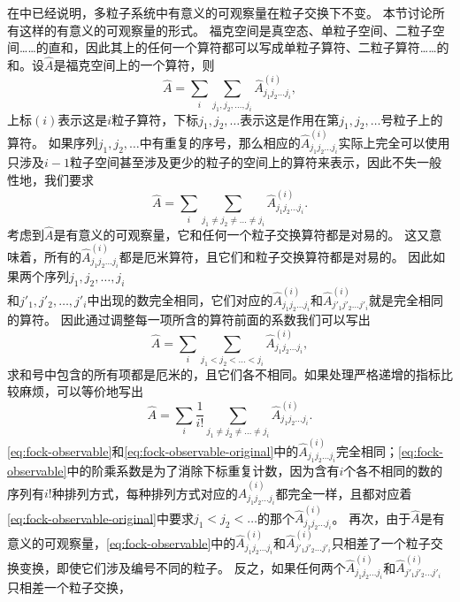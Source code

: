 \documentclass[hyperref, UTF8, a4paper]{ctexart}
\renewcommand{\autoref}{\prettyref}
\begin{document}
在\autoref{sec:n-particle-space}中已经说明，多粒子系统中有意义的可观察量在粒子交换下不变。
本节讨论所有这样的有意义的可观察量的形式。
福克空间是真空态、单粒子空间、二粒子空间……的直和，因此其上的任何一个算符都可以写成单粒子算符、二粒子算符……的和。设$\hat{A}$是福克空间上的一个算符，则
\[
    \hat{A} = \sum_i \sum_{j_1, j_2, \ldots, j_i} \hat{A}^{(i)}_{j_1 j_2 \ldots j_i},
\]
上标$(i)$表示这是$i$粒子算符，下标$j_1, j_2, \ldots$表示这是作用在第$j_1, j_2, \ldots$号粒子上的算符。
如果序列$j_1, j_2, \ldots$中有重复的序号，那么相应的$\hat{A}^{(i)}_{j_1 j_2 \ldots j_i}$实际上完全可以使用只涉及$i-1$粒子空间甚至涉及更少的粒子的空间上的算符来表示，因此不失一般性地，我们要求
\[
    \hat{A} = \sum_i \sum_{j_1 \neq j_2 \neq \ldots \neq j_i} \hat{A}^{(i)}_{j_1 j_2 \ldots j_i}.
\]
考虑到$\hat{A}$是有意义的可观察量，它和任何一个粒子交换算符都是对易的。
这又意味着，所有的$\hat{A}^{(i)}_{j_1 j_2 \ldots j_i}$都是厄米算符，且它们和粒子交换算符都是对易的。
因此如果两个序列$j_1, j_2, \ldots, j_i$ \\
和$j'_1, j'_2, \ldots, j'_i$中出现的数完全相同，它们对应的$\hat{A}^{(i)}_{j_1 j_2 \ldots j_i}$和$\hat{A}^{(i)}_{j'_1 j'_2 \ldots j'_i}$就是完全相同的算符。
因此通过调整每一项所含的算符前面的系数我们可以写出
\begin{equation}
    \hat{A} = \sum_i \sum_{j_1 < j_2 < \ldots < j_i} \hat{A}^{(i)}_{j_1 j_2 \ldots j_i},
    \label{eq:fock-observable-original}
\end{equation}
求和号中包含的所有项都是厄米的，且它们各不相同。如果处理严格递增的指标比较麻烦，可以等价地写出
\begin{equation}
    \hat{A} = \sum_i \frac{1}{i!} \sum_{j_1 \neq j_2 \neq \ldots \neq j_i} \hat{A}^{(i)}_{j_1 j_2 \ldots j_i}.
    \label{eq:fock-observable}
\end{equation}
\eqref{eq:fock-observable}和\eqref{eq:fock-observable-original}中的$\hat{A}^{(i)}_{j_1 j_2 \ldots j_i}$完全相同；\eqref{eq:fock-observable}中的阶乘系数是为了消除下标重复计数，因为含有$i$个各不相同的数的序列有$i!$种排列方式，每种排列方式对应的$\hat{A}^{(i)}_{j_1 j_2 \ldots j_i}$都完全一样，且都对应着\eqref{eq:fock-observable-original}中要求$j_1 < j_2 < \ldots$的那个$\hat{A}^{(i)}_{j_1 j_2 \ldots j_i}$。
再次，由于$\hat{A}$是有意义的可观察量，\eqref{eq:fock-observable}中的$\hat{A}^{(i)}_{j_1 j_2 \ldots j_i}$和$\hat{A}^{(i)}_{j'_1 j'_2 \ldots j'_i}$只相差了一个粒子交换变换，即使它们涉及编号不同的粒子。
反之，如果任何两个$\hat{A}^{(i)}_{j_1 j_2 \ldots j_i}$和$\hat{A}^{(i)}_{j'_1 j'_2 \ldots j'_i}$只相差一个粒子交换，%
\end{document}
